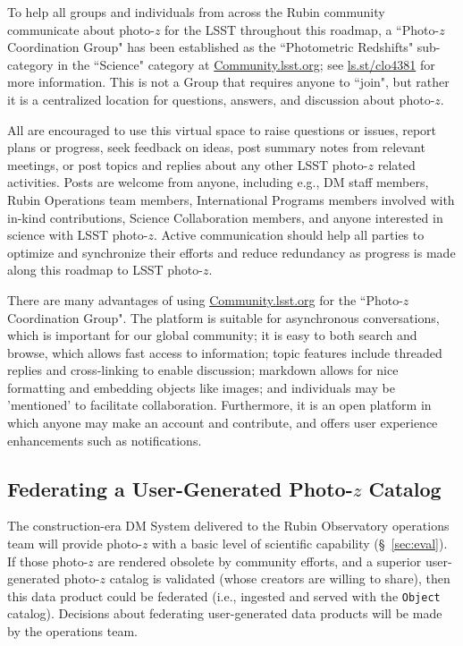 \documentclass[DM,authoryear,toc]{lsstdoc}
\begin{document}
To help all groups and individuals from across the Rubin community communicate about photo-$z$ for the LSST throughout this roadmap, a ``Photo-$z$ Coordination Group" has been established as the ``Photometric Redshifts" sub-category in the ``Science" category at \url{Community.lsst.org}; see \url{ls.st/clo4381} for more information.
This is not a Group that requires anyone to ``join", but rather it is a centralized location for questions, answers, and discussion about photo-$z$.

All are encouraged to use this virtual space to raise questions or issues, report plans or progress, seek feedback on ideas, post summary notes from relevant meetings, or post topics and replies about any other LSST photo-$z$ related activities.
Posts are welcome from anyone, including e.g., DM staff members, Rubin Operations team members, International Programs members involved with in-kind contributions, Science Collaboration members, and anyone interested in science with LSST photo-$z$.
Active communication should help all parties to optimize and synchronize their efforts and reduce redundancy as progress is made along this roadmap to LSST photo-$z$.

There are many advantages of using \url{Community.lsst.org} for the ``Photo-$z$ Coordination Group".
The platform is suitable for asynchronous conversations, which is important for our global community; it is easy to both search and browse, which allows fast access to information; topic features include threaded replies and cross-linking to enable discussion; markdown allows for nice formatting and embedding objects like images; and individuals may be 'mentioned' to facilitate collaboration.
Furthermore, it is an open platform in which anyone may make an account and contribute, and offers user experience enhancements such as notifications.

\subsection{Federating a User-Generated Photo-$z$ Catalog}\label{ssec:time_ops_ugfed}

The construction-era DM System delivered to the Rubin Observatory operations team will provide photo-$z$ with a basic level of scientific capability (\S~\ref{sec:eval}). 
If those photo-$z$ are rendered obsolete by community efforts, and a superior user-generated photo-$z$ catalog is validated (whose creators are willing to share), then this data product could be federated (i.e., ingested and served with the {\tt Object} catalog).
Decisions about federating user-generated data products will be made by the operations team.
\end{document}
